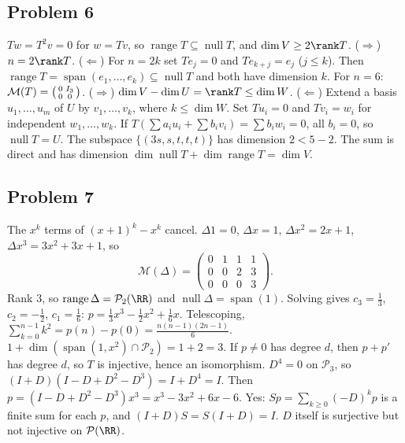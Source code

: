 \documentclass[11pt]{scrartcl}
\DeclareMathOperator{\nul}{null}
\DeclareMathOperator{\range}{range}
\DeclareMathOperator{\spn}{span}
\newcommand{\PP}{\mathcal P}
\newcommand{\MM}{\mathcal M}
\begin{document}
\subsection*{Problem 6}
\begin{enumerate}[(a)]
  \ii $Tw=T^2v=0$ for $w=Tv$, so $\range T\subseteq\nul T$, and $\dim V\ge2\rank T$.
  \ii ($\Rightarrow$) $n=2\rank T$.
  ($\Leftarrow$) For $n=2k$ set $Te_j=0$ and $Te_{k+j}=e_j$ ($j\le k$).
  Then $\range T=\spn(e_1,\dots,e_k)\subseteq\nul T$ and both have dimension $k$.
  For $n=6$: $\MM(T)=\begin{psmallmatrix}0&I_3\\0&0\end{psmallmatrix}$.
  \ii ($\Rightarrow$) $\dim V-\dim U=\rank T\le\dim W$.
  ($\Leftarrow$) Extend a basis $u_1,\dots,u_m$ of $U$ by $v_1,\dots,v_k$, where $k\le\dim W$.
  Set $Tu_i=0$ and $Tv_i=w_i$ for independent $w_1,\dots,w_k$.
  If $T(\sum a_iu_i+\sum b_iv_i)=\sum b_iw_i=0$, all $b_i=0$, so $\nul T=U$.
  \ii The subspace $\{(3s,s,t,t,t)\}$ has dimension $2<5-2$.
  \ii The sum is direct and has dimension $\dim\nul T+\dim\range T=\dim V$.
\end{enumerate}

\subsection*{Problem 7}
\begin{enumerate}[(a)]
  \ii The $x^k$ terms of $(x+1)^k-x^k$ cancel.
  $\Delta1=0$, $\Delta x=1$, $\Delta x^2=2x+1$, $\Delta x^3=3x^2+3x+1$, so
  \[ \MM(\Delta)=\begin{pmatrix}0&1&1&1\\0&0&2&3\\0&0&0&3\end{pmatrix}. \]
  Rank $3$, so $\range\Delta=\PP_2(\RR)$ and $\nul\Delta=\spn(1)$.
  \ii Solving gives $c_3=\tfrac13$, $c_2=-\tfrac12$, $c_1=\tfrac16$:
  $p=\tfrac13x^3-\tfrac12x^2+\tfrac16x$.
  Telescoping, $\sum_{k=0}^{n-1}k^2=p(n)-p(0)=\tfrac{n(n-1)(2n-1)}{6}$.
  \ii $1+\dim(\spn(1,x^2)\cap\PP_2)=1+2=3$.
  \ii If $p\ne0$ has degree $d$, then $p+p'$ has degree $d$, so $T$ is injective, hence an isomorphism.
  $D^4=0$ on $\PP_3$, so $(I+D)(I-D+D^2-D^3)=I+D^4=I$.
  Then $p=(I-D+D^2-D^3)x^3=x^3-3x^2+6x-6$.
  \ii Yes: $Sp=\sum_{k\ge0}(-D)^kp$ is a finite sum for each $p$, and $(I+D)S=S(I+D)=I$.
  $D$ itself is surjective but not injective on $\PP(\RR)$.
\end{enumerate}
\end{document}
